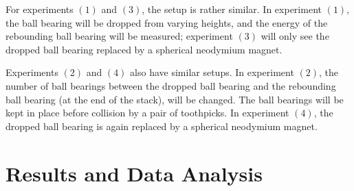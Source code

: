\documentclass[aip,jmp,amsmath,amssymb,reprint,author-numerical]{revtex4-1}
\begin{document}
        For experiments $(1)$ and $(3)$, the setup is rather similar. In experiment $(1)$, the ball
        bearing will be dropped from varying heights, and the energy of the rebounding ball bearing
        will be measured; experiment $(3)$ will only see the dropped ball bearing replaced by a
        spherical neodymium magnet.

        Experiments $(2)$ and $(4)$ also have similar setups. In experiment $(2)$, the number of ball
        bearings between the dropped ball bearing and the rebounding ball bearing (at the end of the
        stack), will be changed. The ball bearings will be kept in place before collision by a pair of
        toothpicks. In experiment $(4)$, the dropped ball bearing is again replaced by a spherical
        neodymium magnet.


    \section{\label{sec:result}Results and Data Analysis}
\end{document}
